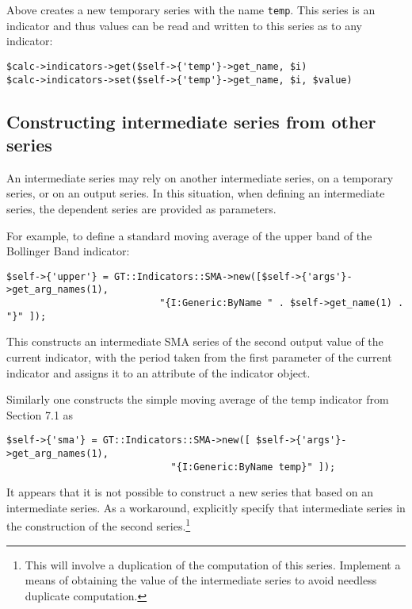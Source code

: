 \documentclass[11pt,twoside]{article}
\begin{document}
Above creates a new temporary series with the name
\lstinline!temp!. This series is an indicator and thus values
can be read and written to this series as to any indicator:
\begin{lstlisting}[numbers=none]
$calc->indicators->get($self->{'temp'}->get_name, $i)
$calc->indicators->set($self->{'temp'}->get_name, $i, $value)
\end{lstlisting}

\subsection[Constructing intermediate series from other
series]{\label{bkm:Ref192502529}Constructing intermediate series from
other series}
An intermediate series may rely on another intermediate series, on a
temporary series, or on an output series. In this situation, when
defining an intermediate series, the dependent series are provided as
parameters.

For example, to define a standard moving average of the upper band of
the Bollinger Band indicator:
\begin{lstlisting}[numbers=none]
$self->{'upper'} = GT::Indicators::SMA->new([$self->{'args'}->get_arg_names(1),
                           "{I:Generic:ByName " . $self->get_name(1) . "}" ]);
\end{lstlisting}

This constructs an intermediate SMA series of the second output value of
the current indicator, with the period taken from the first parameter
of the current indicator and assigns it to an attribute of the
indicator object.

Similarly one constructs the simple moving average of the temp indicator
from Section 7.1 as
\begin{lstlisting}[numbers=none]
$self->{'sma'} = GT::Indicators::SMA->new([ $self->{'args'}->get_arg_names(1),
                             "{I:Generic:ByName temp}" ]);
\end{lstlisting}

It appears that it is not possible to construct a new series that based
on an intermediate series. As a workaround, explicitly specify that
intermediate series in the construction of the second
series.\footnote{This will involve a duplication of the computation
of this series. Implement a means of obtaining the value of the
intermediate series to avoid needless duplicate computation.}
\end{document}
